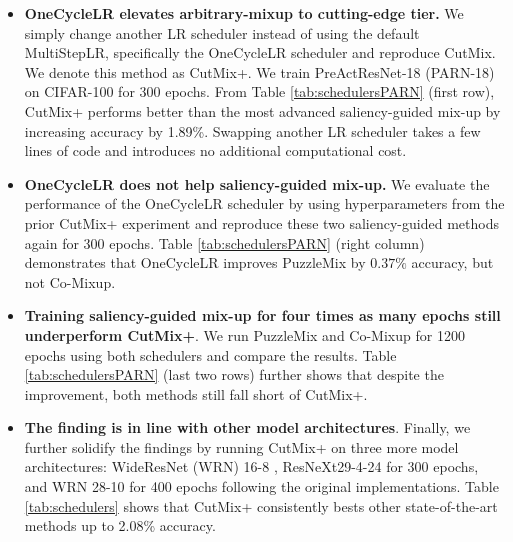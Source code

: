 \documentclass[letterpaper]{article} \usepackage[submission]{aaai23}  \usepackage{times}  \usepackage{helvet}  \usepackage{courier}  \usepackage[hyphens]{url}  \usepackage{graphicx} \urlstyle{rm} \def\UrlFont{\rm}  \usepackage{natbib}  \usepackage{caption} \frenchspacing  \setlength{\pdfpagewidth}{8.5in} \setlength{\pdfpageheight}{11in}
\newcommand{\cutmix}{{CutMix}}
\newcommand{\puzzlemix}{{PuzzleMix}}
\newcommand{\comixup}{{Co-Mixup}}
\newcommand{\cifar}{CIFAR-100}
\begin{document}
\begin{itemize}
    \item \textbf{OneCycleLR elevates arbitrary-mixup to cutting-edge tier.} We simply change another LR scheduler instead of using the default MultiStepLR, specifically the OneCycleLR scheduler \cite{smith2018superconvergence} and reproduce \cutmix{}. We denote this method as \cutmix{}+. We train PreActResNet-18 (PARN-18) \cite{he2016preact} on \cifar{} for 300 epochs. From Table \ref{tab:schedulersPARN} (first row), \cutmix{}+ performs better than the most advanced saliency-guided mix-up by increasing accuracy by 1.89\%.
    Swapping another LR scheduler takes a few lines of code and introduces no additional computational cost.
    
    
    \item \textbf{OneCycleLR does not help saliency-guided mix-up.} We evaluate the performance of the OneCycleLR scheduler by using hyperparameters from the prior \cutmix{}+ experiment and reproduce these two saliency-guided methods again for 300 epochs. Table \ref{tab:schedulersPARN} (right column) demonstrates that OneCycleLR improves \puzzlemix{} by $0.37\%$ accuracy, but not \comixup{}.

    
    \item \textbf{Training saliency-guided mix-up for four times as many epochs still underperform \cutmix{}+}. We run \puzzlemix{} and \comixup{} for 1200 epochs using both schedulers and compare the results. Table \ref{tab:schedulersPARN} (last two rows) further shows that despite the improvement, both methods still fall short of \cutmix{}+. 
    
    \item \textbf{The finding is in line with other model architectures}. Finally, we further solidify the findings by running \cutmix{}+ on three more model architectures: WideResNet (WRN) 16-8 \cite{zagoruyko2017widern}, ResNeXt29-4-24 \cite{xie2016resnext} for 300 epochs, and WRN 28-10 for 400 epochs following the original implementations. Table \ref{tab:schedulers} shows that \cutmix{}+ consistently bests other state-of-the-art methods up to 2.08\% accuracy.
\end{itemize}
\end{document}
